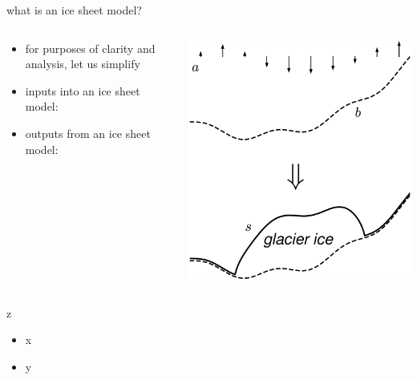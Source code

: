 \documentclass[svgnames,
               hyperref={colorlinks,citecolor=DeepPink4,linkcolor=FireBrick,urlcolor=Maroon},
               usepdftitle=false]  %
               {beamer}
\begin{document}
\begin{frame}{what is an ice sheet model?}

\begin{columns}
\begin{column}{0.63\textwidth}
\begin{itemize}
\item for purposes of clarity and analysis, let us simplify
\item inputs into an ice sheet model:
\item outputs from an ice sheet model:
\end{itemize}
\end{column}
\begin{column}{0.4\textwidth}
\includegraphics[width=\textwidth]{images/coverfig.png}
\end{column}
\end{columns}
\end{frame}


\begin{frame}{z}

\begin{itemize}
\item x
\item y
\end{itemize}
\end{frame}
\end{document}
